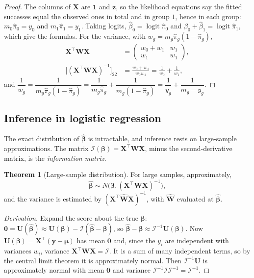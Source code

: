 \documentclass[11pt,a4paper]{article}
\numberwithin{equation}{section}
\theoremstyle{definition}
\newtheorem{thm}{Theorem}[subsection]
\begin{document}
\begin{proof}
The columns of $\mathbf{X}$ are $\mathbf{1}$ and $\mathbf{z}$, so the likelihood equations say the fitted successes equal the
observed ones in total and in group $1$, hence in each group: $m_0\hat\pi_0 = y_0$ and $m_1\hat\pi_1 = y_1$. Taking logits,
$\hat\beta_0 = \operatorname{logit}\hat\pi_0$ and $\hat\beta_0 + \hat\beta_1 = \operatorname{logit}\hat\pi_1$, which give the formulas. For the variance,
with $w_g = m_g\hat\pi_g(1 - \hat\pi_g)$,
\begin{align*}
\mathbf{X}^\top\mathbf{WX} &= \begin{pmatrix} w_0 + w_1 & w_1 \\ w_1 & w_1 \end{pmatrix} , \\
\bigl[(\mathbf{X}^\top\mathbf{WX})^{-1}\bigr]_{22} &= \frac{w_0 + w_1}{w_0w_1} = \frac{1}{w_0} + \frac{1}{w_1} ,
\end{align*}
and $\dfrac{1}{w_g} = \dfrac{1}{m_g\hat\pi_g(1 - \hat\pi_g)} = \dfrac{1}{m_g\hat\pi_g} + \dfrac{1}{m_g(1 - \hat\pi_g)} = \dfrac{1}{y_g} + \dfrac{1}{m_g - y_g}$.
\end{proof}

\subsection{Inference in logistic regression}
The exact distribution of $\hat{\boldsymbol\beta}$ is intractable, and inference rests on large-sample approximations.
The matrix $\mathcal{I}(\boldsymbol\beta) = \mathbf{X}^\top\mathbf{WX}$, minus the second-derivative matrix, is the \emph{information matrix}.

\begin{thm}[Large-sample distribution]\label{thm:wald}
For large samples, approximately,
\[
\hat{\boldsymbol\beta} \sim N\bigl(\boldsymbol\beta, (\mathbf{X}^\top\mathbf{WX})^{-1}\bigr) ,
\]
and the variance is estimated by $(\mathbf{X}^\top\hat{\mathbf{W}}\mathbf{X})^{-1}$, with $\hat{\mathbf{W}}$ evaluated at $\hat{\boldsymbol\beta}$.
\end{thm}

\begin{proof}[Derivation]
Expand the score about the true $\boldsymbol\beta$: $\mathbf{0} = \mathbf{U}(\hat{\boldsymbol\beta}) \approx \mathbf{U}(\boldsymbol\beta) - \mathcal{I}(\hat{\boldsymbol\beta} - \boldsymbol\beta)$, so
$\hat{\boldsymbol\beta} - \boldsymbol\beta \approx \mathcal{I}^{-1}\mathbf{U}(\boldsymbol\beta)$. Now $\mathbf{U}(\boldsymbol\beta) = \mathbf{X}^\top(\mathbf{y} - \boldsymbol\mu)$ has mean $\mathbf{0}$ and, since the $y_i$ are independent
with variances $w_i$, variance $\mathbf{X}^\top\mathbf{WX} = \mathcal{I}$. It is a sum of many independent terms, so by the central limit
theorem it is approximately normal. Then $\mathcal{I}^{-1}\mathbf{U}$ is approximately normal with mean $\mathbf{0}$ and variance
$\mathcal{I}^{-1}\mathcal{I}\mathcal{I}^{-1} = \mathcal{I}^{-1}$.
\end{proof}
\end{document}
